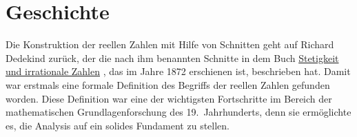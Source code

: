 \section{Geschichte}
Die Konstruktion der reellen
Zahlen mit Hilfe von Schnitten geht auf Richard Dedekind zur\"uck, der die nach ihm benannten Schnitte in dem Buch
\href{http://books.google.de/books?id=n-43AAAAMAAJ&printsec=frontcover&source=gbs_ge_summary_r&cad=0#v=onepage&q&f=false}{Stetigkeit und irrationale Zahlen} 
\cite{dedekind:1872}, das im Jahre 1872 erschienen ist, beschrieben hat.  Damit war erstmals eine
formale Definition des Begriffs der reellen Zahlen gefunden worden.  Diese Definition war eine der wichtigsten
Fortschritte im Bereich der mathematischen Grundlagenforschung des 19.~Jahrhunderts, denn sie
erm\"oglichte es, die Analysis auf ein solides Fundament zu stellen.


